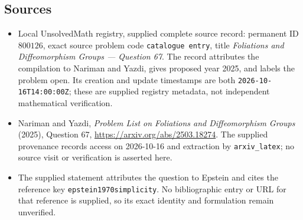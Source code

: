 \documentclass[11pt]{article}
\begin{document}
\subsection{Sources}
\begin{itemize}
\item Local UnsolvedMath registry, supplied complete source record: permanent ID \(800126\), exact source problem code \texttt{catalogue entry}, title \emph{Foliations and Diffeomorphism Groups --- Question 67}. The record attributes the compilation to Nariman and Yazdi, gives proposed year 2025, and labels the problem open. Its creation and update timestamps are both \texttt{2026-10-16T14:00:00Z}; these are supplied registry metadata, not independent mathematical verification.
\item Nariman and Yazdi, \emph{Problem List on Foliations and Diffeomorphism Groups} (2025), Question 67, \url{https://arxiv.org/abs/2503.18274}. The supplied provenance records access on 2026-10-16 and extraction by \texttt{arxiv\_latex}; no source visit or verification is asserted here.
\item The supplied statement attributes the question to Epstein and cites the reference key \texttt{epstein1970simplicity}. No bibliographic entry or URL for that reference is supplied, so its exact identity and formulation remain unverified.
\end{itemize}
\end{document}
